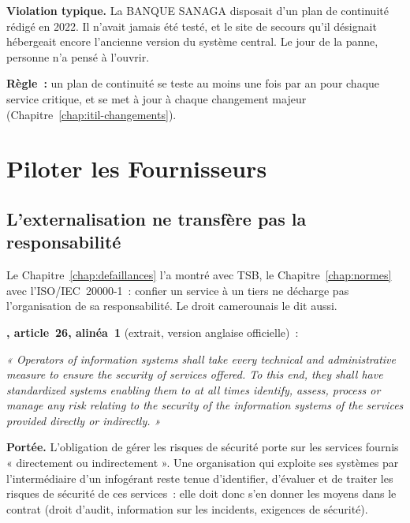 \begin{boxalert}
\textbf{Violation typique.} La BANQUE SANAGA disposait d'un plan de
continuité rédigé en 2022. Il n'avait jamais été testé, et le site de
secours qu'il désignait hébergeait encore l'ancienne version du système
central. Le jour de la panne, personne n'a pensé à l'ouvrir.

\smallskip
\textbf{Règle~:} un plan de continuité se teste au moins une fois par an
pour chaque service critique, et se met à jour à chaque changement majeur
(Chapitre~\ref{chap:itil-changements}).
\end{boxalert}

\section{Piloter les Fournisseurs}
\label{sec:c15-fournisseurs}

\subsection{L'externalisation ne transfère pas la responsabilité}

Le Chapitre~\ref{chap:defaillances} l'a montré avec TSB, le
Chapitre~\ref{chap:normes} avec l'ISO/IEC~20000-1~: confier un service à
un tiers ne décharge pas l'organisation de sa responsabilité. Le droit
camerounais le dit aussi.

\begin{boxjuris}
\textbf{, article~26, alinéa~1} (extrait, version
anglaise officielle)~:

\medskip
\textit{« Operators of information systems shall take every technical and
administrative measure to ensure the security of services offered. To
this end, they shall have standardized systems enabling them to at all
times identify, assess, process or manage any risk relating to the
security of the information systems of the services provided directly or
indirectly. »}

\medskip
\textbf{Portée.} L'obligation de gérer les risques de sécurité porte sur
les services fournis « directement ou indirectement ». Une organisation qui
exploite ses systèmes par l'intermédiaire d'un infogérant reste tenue
d'identifier, d'évaluer et de traiter les risques de sécurité de ces
services~: elle doit donc s'en donner les moyens dans le contrat (droit
d'audit, information sur les incidents, exigences de sécurité).
\end{boxjuris}

